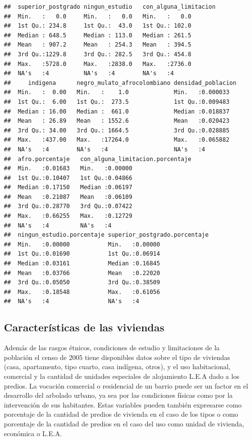 \documentclass[12pt,]{book}
\begin{document}
\begin{verbatim}
##  superior_postgrado ningun_estudio   con_alguna_limitacion
##  Min.   :   0.0     Min.   :   0.0   Min.   :   0.0       
##  1st Qu.: 234.8     1st Qu.:  43.0   1st Qu.: 102.0       
##  Median : 648.5     Median : 113.0   Median : 261.5       
##  Mean   : 907.2     Mean   : 254.3   Mean   : 394.5       
##  3rd Qu.:1229.8     3rd Qu.: 282.5   3rd Qu.: 454.8       
##  Max.   :5728.0     Max.   :2838.0   Max.   :2736.0       
##  NA's   :4          NA's   :4        NA's   :4            
##     indigena      negro_mulato_afrocolombiano densidad_poblacion
##  Min.   :  0.00   Min.   :    1.0             Min.   :0.000033  
##  1st Qu.:  6.00   1st Qu.:  273.5             1st Qu.:0.009483  
##  Median : 16.00   Median :  661.0             Median :0.018837  
##  Mean   : 26.89   Mean   : 1552.6             Mean   :0.020423  
##  3rd Qu.: 34.00   3rd Qu.: 1664.5             3rd Qu.:0.028885  
##  Max.   :437.00   Max.   :17264.0             Max.   :0.065882  
##  NA's   :4        NA's   :4                   NA's   :4         
##  afro.porcentaje   con_alguna_limitacion.porcentaje
##  Min.   :0.01683   Min.   :0.00000                 
##  1st Qu.:0.10407   1st Qu.:0.04866                 
##  Median :0.17150   Median :0.06197                 
##  Mean   :0.21087   Mean   :0.06109                 
##  3rd Qu.:0.28770   3rd Qu.:0.07422                 
##  Max.   :0.66255   Max.   :0.12729                 
##  NA's   :4         NA's   :4                       
##  ningun_estudio.porcentaje superior_postgrado.porcentaje
##  Min.   :0.00000           Min.   :0.00000              
##  1st Qu.:0.01690           1st Qu.:0.06914              
##  Median :0.03161           Median :0.16845              
##  Mean   :0.03766           Mean   :0.22020              
##  3rd Qu.:0.05050           3rd Qu.:0.38509              
##  Max.   :0.18548           Max.   :0.61056              
##  NA's   :4                 NA's   :4
\end{verbatim}

\subsection{Características de las
viviendas}\label{caracteristicas-de-las-viviendas}

Además de las rasgos étnicos, condiciones de estudio y limitaciones de
la población el censo de 2005 tiene disponibles datos sobre el tipo de
viviendas (casa, apartamento, tipo cuarto, casa indígena, otros), y el
uso habitacional, comercial y la cantidad de unidades especiales de
alojamiento L.E.A dado a los predios. La vocación comercial o
residencial de un barrio puede ser un factor en el desarrollo del
arbolado urbano, ya sea por las condiciones físicas como por la
intervención de sus habitantes. Estas variables pueden también
expresarse como porcentaje de la cantidad de predios de vivienda en el
caso de los tipos o como porcentaje de la cantidad de predios en el caso
del uso como unidad de vivienda, económica o L.E.A.
\end{document}
